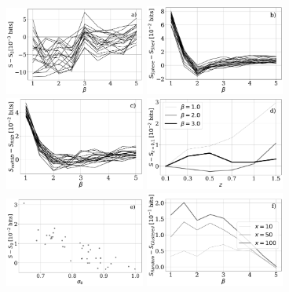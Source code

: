 \documentclass[fleqn,usenatbib]{mnras}
\begin{document}
\begin{figure}
    \centering
    \includegraphics[width=0.41\textwidth]{cosmic_variance.pdf} 
    \includegraphics[width=0.41\textwidth]{geometry.pdf} 
    \includegraphics[width=0.41\textwidth]{rsd.pdf} 
    \includegraphics[width=0.41\textwidth]{redshift.pdf} 
    \includegraphics[width=0.41\textwidth]{param.pdf}
    \includegraphics[width=0.41\textwidth]{random_clustered_n1.pdf}

\end{figure}
\end{document}
